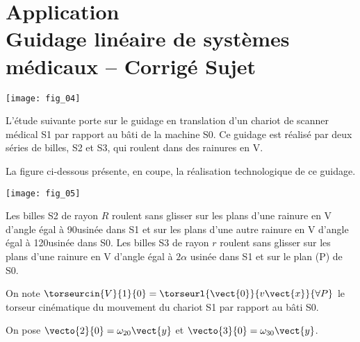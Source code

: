 \chapter*{Application  \\ 
Guidage linéaire de systèmes médicaux -- \ifprof Corrigé \else Sujet \fi}

\iflivret {} \else
\ifprof  {} \else \fi
\fi

\setcounter{question}{0}

\marginnote[1cm]{
}



\begin{marginfigure}
\texttt{[image: fig\_04]}
\end{marginfigure}

L’étude suivante porte sur le guidage en translation d’un chariot 
de scanner médical S1 par rapport au bâti de la machine S0. Ce 
guidage est réalisé par deux séries de billes, S2 et S3, qui roulent 
dans des rainures en V. 

La figure ci-dessous présente, en coupe, la réalisation technologique de ce guidage. 

\begin{center}
\texttt{[image: fig\_05]}
\end{center}

Les billes S2 de rayon $R$ roulent sans glisser sur les plans d’une rainure en V d’angle égal à 90\textdegree usinée dans 
S1 et sur les plans d’une autre rainure en V d’angle égal à 120\textdegree usinée dans S0. 
Les billes S3 de rayon $r$ roulent sans glisser sur les plans d’une rainure en V d’angle égal à 
$2\alpha$ usinée dans 
S1 et sur le plan (P) de S0. 

On note $\torseurcin{V}{1}{0}=\torseurl{\vect{0}}{v\vect{x}}{\forall P}$ le torseur cinématique du mouvement du chariot S1 par rapport au bâti S0. 

On pose $\vecto{2}{0} = \omega_{20}\vect{y}$ et $\vecto{3}{0} = \omega_{30}\vect{y}$.

\ifprof
\begin{corrige}
\end{corrige} \else \fi

